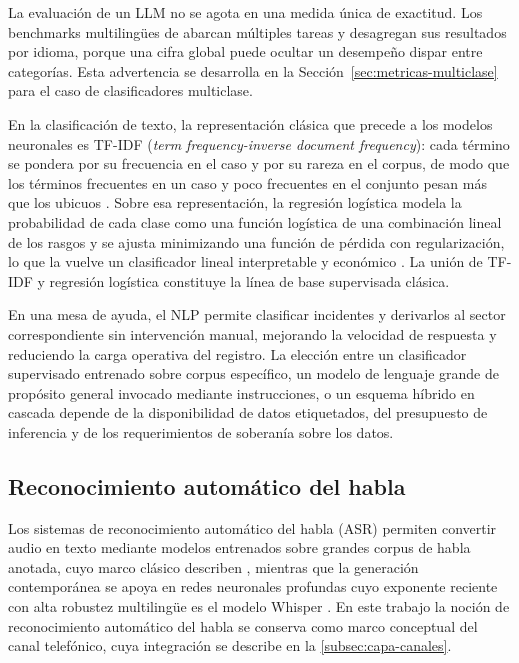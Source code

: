 La evaluación de un LLM no se agota en una medida única de exactitud. Los benchmarks multilingües de \textcite{xuan2025mmluprox} abarcan múltiples tareas y desagregan sus resultados por idioma, porque una cifra global puede ocultar un desempeño dispar entre categorías. Esta advertencia se desarrolla en la Sección~\ref{sec:metricas-multiclase} para el caso de clasificadores multiclase.

En la clasificación de texto, la representación clásica que precede a los modelos neuronales es TF-IDF (\emph{term frequency-inverse document frequency}): cada término se pondera por su frecuencia en el caso y por su rareza en el corpus, de modo que los términos frecuentes en un caso y poco frecuentes en el conjunto pesan más que los ubicuos \parencite{Jurafsky2026_speech_language}. Sobre esa representación, la regresión logística modela la probabilidad de cada clase como una función logística de una combinación lineal de los rasgos y se ajusta minimizando una función de pérdida con regularización, lo que la vuelve un clasificador lineal interpretable y económico \parencite{Jurafsky2026_speech_language}. La unión de TF-IDF y regresión logística constituye la línea de base supervisada clásica.

En una mesa de ayuda, el NLP permite clasificar incidentes y derivarlos al sector correspondiente sin intervención manual, mejorando la velocidad de respuesta y reduciendo la carga operativa del registro. La elección entre un clasificador supervisado entrenado sobre corpus específico, un modelo de lenguaje grande de propósito general invocado mediante instrucciones, o un esquema híbrido en cascada depende de la disponibilidad de datos etiquetados, del presupuesto de inferencia y de los requerimientos de soberanía sobre los datos.

\subsection{Reconocimiento automático del habla}\label{subsec:reconocimiento-habla}

Los sistemas de reconocimiento automático del habla (ASR) permiten convertir audio en texto mediante modelos entrenados sobre grandes corpus de habla anotada, cuyo marco clásico describen \textcite{Rabiner1993_speech_recognition}, mientras que la generación contemporánea se apoya en redes neuronales profundas cuyo exponente reciente con alta robustez multilingüe es el modelo Whisper
\parencite{Radford2023_whisper}. En este trabajo la noción de reconocimiento automático del habla se conserva como marco conceptual del canal telefónico, cuya integración se describe en la \autoref{subsec:capa-canales}.

